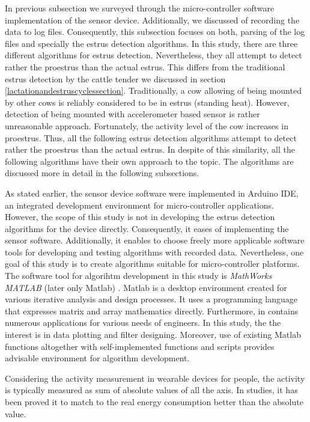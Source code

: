 \documentclass[english,12pt,a4paper,pdftex,elec,utf8]{aaltothesis}
\begin{document}
In previous subsection we surveyed through the micro-controller software implementation of the sensor device. Additionally, we discussed of recording the data to log files. Consequently, this subsection focuses on both, parsing of the log files and specially the estrus detection algorithms. In this study, there are three different algorithms for estrus detection. Nevertheless, they all attempt to detect rather the proestrus than the actual estrus. This differs from the traditional estrus detection by the cattle tender we discussed in section \ref{lactationandestruscyclessection}. Traditionally, a cow allowing of being mounted by other cows is reliably considered to be in estrus (standing heat). However, detection of being mounted with accelerometer based sensor is rather unreasonable approach. Fortunately, the activity level of the cow increases in proestrus. Thus, all the following estrus detection algorithms attempt to detect rather the proestrus than the actual estrus. In despite of this similarity, all the following algorithms have their own approach to the topic. The algorithms are discussed more in detail in the following subsections.  

As stated earlier, the sensor device software were implemented in Arduino IDE, an integrated development environment for micro-controller applications. However, the scope of this study is not in developing the estrus detection algorithms for the device directly. Consequently, it eases of implementing the sensor software. Additionally, it enables to choose freely more applicable software tools for developing and testing algorithms with recorded data. Nevertheless, one goal of this study is to create algorithms suitable for micro-controller platforms. The software tool for algorihtm development in this study is \textit{MathWorks MATLAB} (later only Matlab) \cite{matlaboverview}. Matlab is a desktop environment created for various iterative analysis and design processes. It uses a programming language that expresses matrix and array mathematics directly. Furthermore, in contains numerous applications for various needs of engineers. In this study, the the interest is in data plotting and filter designing. Moreover, use of existing Matlab functions altogether with self-implemented functions and scripts provides advisable environment for algorithm development.  



Considering the activity measurement in wearable devices for people, the activity is typically measured as sum of absolute values of all the axis. In studies, it has been proved it to match to the real energy consumption better than the absolute value. 
\end{document}
